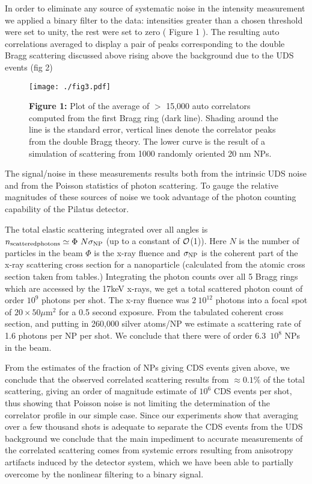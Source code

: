 \documentclass [11pt,fleqn]{article}
\begin{document}
In order to eliminate any source of systematic noise in the intensity measurement
we applied a binary  filter to the data: intensities greater than a chosen threshold
were set to unity, the rest were set to zero ( Figure 1 ). The resulting auto correlations averaged to display a pair of peaks corresponding to the double Bragg scattering discussed above rising above the background due to the UDS events (fig 2)
\begin{figure}[h]
\begin{center}
\texttt{[image: ./fig3.pdf]}
\end{center}
{\bf Figure 1:} Plot of the average of  $>$ 15,000 auto correlators computed from the first Bragg ring (dark line).  Shading around the line  is the standard error, vertical lines denote the correlator peaks from the double Bragg theory. The lower curve is the result of a  simulation of scattering from 1000 randomly oriented 20 nm NPs.
\end{figure}

The signal/noise in these measurements results both from the intrinsic UDS noise and from the Poisson statistics of photon scattering. To gauge the relative magnitudes of these sources of noise we took advantage of the photon counting capability of the Pilatus detector. 

The total elastic scattering integrated over all angles is $n_{\rm scattered photons}\simeq\Phi\ N \sigma_{\rm NP}$ (up to a constant of $\cal O$(1)). Here $N$ is the number of particles in the beam $\Phi$ is the x-ray fluence and $\sigma_{\rm NP}$ is the coherent part of the x-ray scattering cross section for a nanoparticle (calculated from the atomic cross section taken from tables.) Integrating the photon counts over all 5 Bragg rings which are accessed by the 17keV x-rays, we get a total scattered photon count of order $10^9$ photons per shot. The x-ray fluence was $2\ 10^{12}$ photons into a focal spot of $20 \times 50 \mu$m$^2$ for a 0.5 second exposure. From the tabulated coherent cross section, and putting in 260,000 silver atoms/NP we estimate a scattering rate of 1.6 photons per NP per shot. We conclude that there were of order 6.3\ $10^8$ NPs in the beam.

From the estimates of the fraction of NPs giving CDS events given above, we conclude that the observed correlated scattering results from $\approx 0.1\%$ of the total scattering, giving an order of magnitude estimate of  $10^6$ CDS events per shot, thus showing that Poisson noise is not limiting the determination of the correlator profile in our simple case. Since our experiments show that averaging over a few thousand shots is adequate to separate the CDS events from the UDS background we conclude that the main impediment to accurate measurements of the correlated scattering comes from systemic errors resulting from  anisotropy artifacts induced by  the detector system, which we have been able to partially overcome by the nonlinear filtering to a binary signal. 
\end{document}
